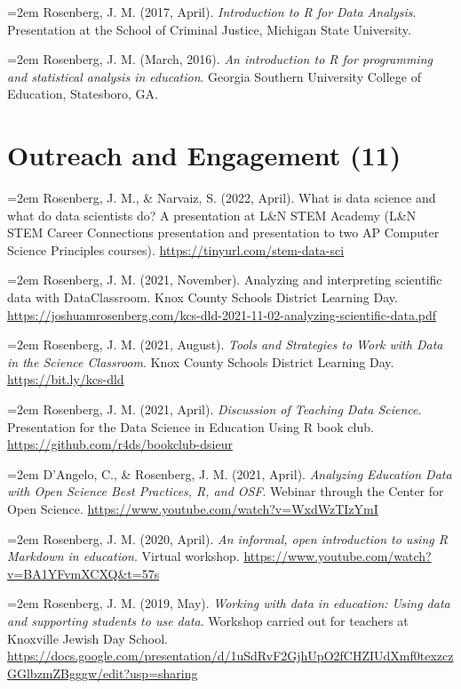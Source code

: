 \documentclass[
  14,
]{article}
\begin{document}
\hangindent=2em Rosenberg, J. M. (2017, April). \emph{Introduction to R
for Data Analysis}. Presentation at the School of Criminal Justice,
Michigan State University.

\hangindent=2em Rosenberg, J. M. (March, 2016). \emph{An introduction to
R for programming and statistical analysis in education}. Georgia
Southern University College of Education, Statesboro, GA.

\hypertarget{outreach-and-engagement-11}{%
\section{Outreach and Engagement
(11)}\label{outreach-and-engagement-11}}

\hangindent=2em Rosenberg, J. M., \& Narvaiz, S. (2022, April). What is
data science and what do data scientists do? A presentation at L\&N STEM
Academy (L\&N STEM Career Connections presentation and presentation to
two AP Computer Science Principles courses).
\url{https://tinyurl.com/stem-data-sci}

\hangindent=2em Rosenberg, J. M. (2021, November). Analyzing and
interpreting scientific data with DataClassroom. Knox County Schools
District Learning Day.
\url{https://joshuamrosenberg.com/kcs-dld-2021-11-02-analyzing-scientific-data.pdf}

\hangindent=2em Rosenberg, J. M. (2021, August). \emph{Tools and
Strategies to Work with Data in the Science Classroom}. Knox County
Schools District Learning Day. \url{https://bit.ly/kcs-dld}

\hangindent=2em Rosenberg, J. M. (2021, April). \emph{Discussion of
Teaching Data Science}. Presentation for the Data Science in Education
Using R book club. \url{https://github.com/r4ds/bookclub-dsieur}

\hangindent=2em D'Angelo, C., \& Rosenberg, J. M. (2021, April).
\emph{Analyzing Education Data with Open Science Best Practices, R, and
OSF}. Webinar through the Center for Open Science.
\url{https://www.youtube.com/watch?v=WxdWzTIzYmI}

\hangindent=2em Rosenberg, J. M. (2020, April). \emph{An informal, open
introduction to using R Markdown in education}. Virtual workshop.
\url{https://www.youtube.com/watch?v=BA1YFvmXCXQ\&t=57s}

\hangindent=2em Rosenberg, J. M. (2019, May). \emph{Working with data in
education: Using data and supporting students to use data}. Workshop
carried out for teachers at Knoxville Jewish Day School.
\url{https://docs.google.com/presentation/d/1uSdRvF2GjhUpO2fCHZIUdXmf0texzczGGlbzmZBgggw/edit?usp=sharing}
\end{document}
